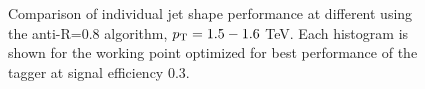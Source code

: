 \begin{figure}
\begin{center}
\caption{Comparison of individual jet shape performance at different \pt using the anti-\kT R=0.8 algorithm, $p_{\rm T}=1.5-1.6$ TeV. Each histogram is shown for the working point optimized for best performance of the tagger at signal efficiency 0.3.}
\label{fig:topmass_histogram_optall_HEP_JH}
\end{center}
\end{figure}

